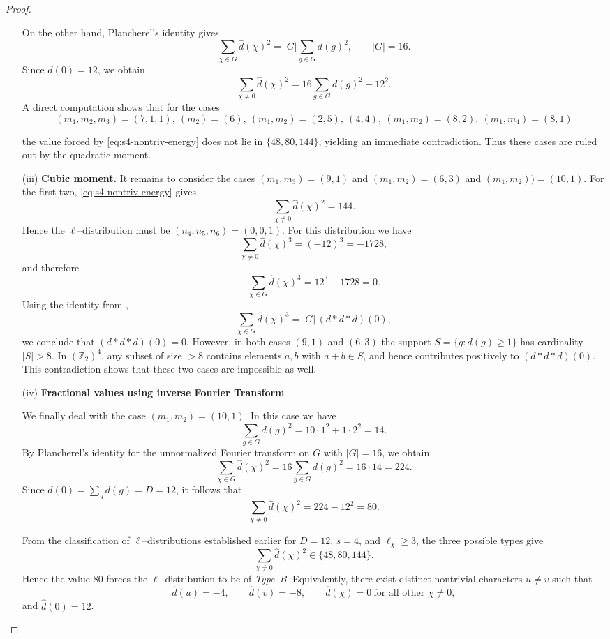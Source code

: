\documentclass[12pt,twoside,]{amsart}
\theoremstyle{plain}
\theoremstyle{definition}
\begin{document}
\begin{proof}
\begin{enumerate}
On the other hand, Plancherel's identity gives
\[
\sum_{\chi\in G}\widehat d(\chi)^2
=
|G|\sum_{g\in G} d(g)^2,
\qquad |G|=16.
\]
Since $\widehat d(0)=12$, we obtain
\begin{equation}\label{eq:s4-nontriv-energy}
\sum_{\chi\neq 0}\widehat d(\chi)^2
=
16\sum_{g\in G} d(g)^2 - 12^2.
\end{equation}
A direct computation shows that for the cases
\[
(m_1,m_2,m_3) = (7,1,1),\ (m_2) = (6),\ (m_1,m_2) = (2,5),\ (4,4),\ (m_1, m_2) = (8,2),\ (m_1, m_4) = (8,1)
\]

the value forced by \eqref{eq:s4-nontriv-energy} does not lie in
$\{48,80,144\}$, yielding an immediate contradiction. Thus these cases are
ruled out by the quadratic moment.

\item[(iii)] \textbf{Cubic moment.}
It remains to consider the cases $(m_1,m_3)=(9,1)$ and $(m_1,m_2)=(6,3)$ and $(m_1, m_2)) = (10, 1)$. For the first two, \eqref{eq:s4-nontriv-energy} gives
\[
\sum_{\chi\neq 0}\widehat d(\chi)^2=144.
\]
Hence the $\ell$--distribution must be $(n_4,n_5,n_6)=(0,0,1)$.
For this distribution we have
\[
\sum_{\chi\neq 0}\widehat d(\chi)^3 = (-12)^3=-1728,
\]
and therefore
\[
\sum_{\chi\in G}\widehat d(\chi)^3
=
12^3-1728=0.
\]
Using the identity from ,
\[
\sum_{\chi\in G}\widehat d(\chi)^3
=
|G|\,(d*d*d)(0),
\]
we conclude that $(d*d*d)(0)=0$. However, in both cases $(9,1)$ and $(6,3)$ the support $S=\{g:d(g)\ge 1\}$ has cardinality $|S|>8$. In $(\mathbb Z_2)^4$, any subset of size $>8$ contains elements $a,b$ with $a+b\in S$, and hence contributes positively to
$(d*d*d)(0)$. This contradiction shows that these two cases are impossible as
well.

\item[(iv)] \textbf{Fractional values using inverse Fourier Transform}

\medskip
We finally deal with the case $(m_1,m_2)=(10,1)$.
In this case we have
\[
\sum_{g\in G} d(g)^2 = 10\cdot 1^2 + 1\cdot 2^2 = 14.
\]
By Plancherel's identity for the unnormalized Fourier transform on $G$ with
$|G|=16$, we obtain
\[
\sum_{\chi\in G}\widehat d(\chi)^2
=
16\sum_{g\in G} d(g)^2
=
16\cdot 14
=
224.
\]
Since $\widehat d(0)=\sum_g d(g)=D=12$, it follows that
\[
\sum_{\chi\neq 0}\widehat d(\chi)^2
=
224-12^2
=
80.
\]

From the classification of $\ell$--distributions established earlier for
$D=12$, $s=4$, and $\ell_\chi\ge 3$, the three possible types give
\[
\sum_{\chi\neq 0}\widehat d(\chi)^2\in\{48,80,144\}.
\]
Hence the value $80$ forces the $\ell$--distribution to be of \emph{Type~B}.
Equivalently, there exist distinct nontrivial characters $u\neq v$ such that
\[
\widehat d(u)=-4,\qquad
\widehat d(v)=-8,\qquad
\widehat d(\chi)=0\ \text{for all other }\chi\neq 0,
\]
and $\widehat d(0)=12$.


\end{enumerate}
\end{proof}
\end{document}
